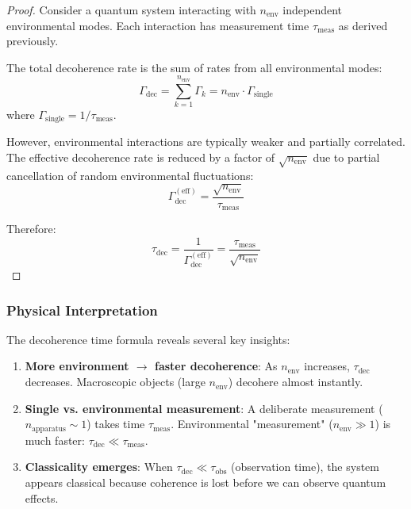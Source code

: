 \begin{proof}
Consider a quantum system interacting with $n_{\text{env}}$ independent environmental modes. Each interaction has measurement time $\tau_{\text{meas}}$ as derived previously.

The total decoherence rate is the sum of rates from all environmental modes:
\begin{equation}
    \Gamma_{\text{dec}} = \sum_{k=1}^{n_{\text{env}}} \Gamma_k = n_{\text{env}} \cdot \Gamma_{\text{single}}
\end{equation}
where $\Gamma_{\text{single}} = 1/\tau_{\text{meas}}$.

However, environmental interactions are typically weaker and partially correlated. The effective decoherence rate is reduced by a factor of $\sqrt{n_{\text{env}}}$ due to partial cancellation of random environmental fluctuations:
\begin{equation}
    \Gamma_{\text{dec}}^{(\text{eff})} = \frac{\sqrt{n_{\text{env}}}}{\tau_{\text{meas}}}
\end{equation}

Therefore:
\begin{equation}
    \tau_{\text{dec}} = \frac{1}{\Gamma_{\text{dec}}^{(\text{eff})}} = \frac{\tau_{\text{meas}}}{\sqrt{n_{\text{env}}}}
\end{equation}
\end{proof}

\subsubsection{Physical Interpretation}

The decoherence time formula reveals several key insights:

\begin{enumerate}
    \item \textbf{More environment $\to$ faster decoherence}: As $n_{\text{env}}$ increases, $\tau_{\text{dec}}$ decreases. Macroscopic objects (large $n_{\text{env}}$) decohere almost instantly.
    
    \item \textbf{Single vs. environmental measurement}: A deliberate measurement ($n_{\text{apparatus}} \sim 1$) takes time $\tau_{\text{meas}}$. Environmental "measurement" ($n_{\text{env}} \gg 1$) is much faster: $\tau_{\text{dec}} \ll \tau_{\text{meas}}$.
    
    \item \textbf{Classicality emerges}: When $\tau_{\text{dec}} \ll \tau_{\text{obs}}$ (observation time), the system appears classical because coherence is lost before we can observe quantum effects.
\end{enumerate}

